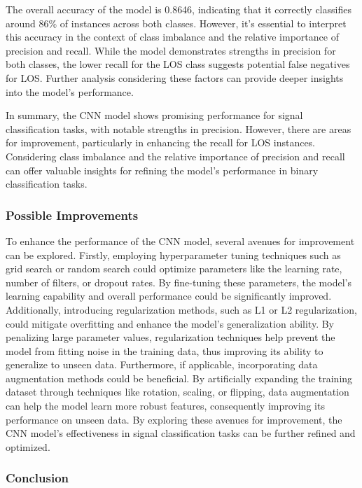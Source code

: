 The overall accuracy of the model is 0.8646, indicating that it correctly classifies around 86\% of instances across both classes. However, it's essential to interpret this accuracy in the context of class imbalance and the relative importance of precision and recall. While the model demonstrates strengths in precision for both classes, the lower recall for the LOS class suggests potential false negatives for LOS. Further analysis considering these factors can provide deeper insights into the model's performance.

In summary, the CNN model shows promising performance for signal classification tasks, with notable strengths in precision. However, there are areas for improvement, particularly in enhancing the recall for LOS instances. Considering class imbalance and the relative importance of precision and recall can offer valuable insights for refining the model's performance in binary classification tasks.


\subsubsection{Possible Improvements}

To enhance the performance of the CNN model, several avenues for improvement can be explored. Firstly, employing hyperparameter tuning techniques such as grid search or random search could optimize parameters like the learning rate, number of filters, or dropout rates. By fine-tuning these parameters, the model's learning capability and overall performance could be significantly improved. Additionally, introducing regularization methods, such as L1 or L2 regularization, could mitigate overfitting and enhance the model's generalization ability. By penalizing large parameter values, regularization techniques help prevent the model from fitting noise in the training data, thus improving its ability to generalize to unseen data. Furthermore, if applicable, incorporating data augmentation methods could be beneficial. By artificially expanding the training dataset through techniques like rotation, scaling, or flipping, data augmentation can help the model learn more robust features, consequently improving its performance on unseen data. By exploring these avenues for improvement, the CNN model's effectiveness in signal classification tasks can be further refined and optimized.

\subsubsection{Conclusion}


